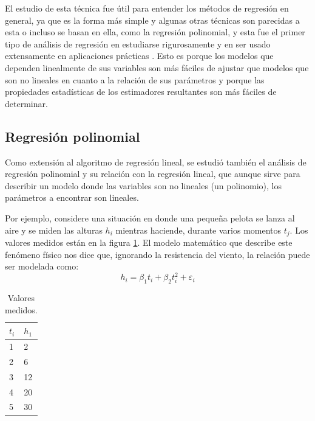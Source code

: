 El estudio de esta técnica fue útil para entender los métodos de regresión en general, ya que es la forma más simple y algunas otras técnicas son parecidas a esta o incluso se basan en ella, como la regresión polinomial, y esta fue el primer tipo de análisis de regresión en estudiarse rigurosamente y en ser usado extensamente en aplicaciones prácticas \cite{XYanLinearRegressionAnalysis}.
Esto es porque los modelos que dependen linealmente de sus variables son más fáciles de ajustar que modelos que son no lineales en cuanto a la relación de sus parámetros y porque las propiedades estadísticas de los estimadores resultantes son más fáciles de determinar.

\subsection{Regresión polinomial}\label{subsec:regresionPolinomial}
Como extensión al algoritmo de regresión lineal, se estudió también el análisis de regresión polinomial y su relación con la regresión lineal, que aunque sirve para describir un modelo donde las variables son no lineales (un polinomio), los parámetros a encontrar son lineales.

Por ejemplo, considere una situación en donde una pequeña pelota se lanza al aire y se miden las alturas $h_i$ mientras haciende, durante varios momentos $t_j$. 
Los valores medidos están en la figura \ref{tab:valoresMedidos}. 
El modelo matemático que describe este fenómeno físico nos dice que, ignorando la resistencia del viento, la relación puede ser modelada como:
$$h_i = \beta_1 t_i + \beta_2 t_i^{2} + \varepsilon_i$$
\begin{table}[!h]
	\begin{center}
		\begin{tabular}{|p{2.5cm}|p{2.5cm}|}\hline
			$t_i$ & $h_1$ \\ \hline
				1 & 2 	\\ \hline
				2 & 6	\\\hline
				3 & 12  \\\hline
				4 & 20  \\\hline
				5 & 30  \\\hline
		\end{tabular}			
	\end{center}
	\caption{Valores medidos.}
	\label{tab:valoresMedidos}
\end{table}


